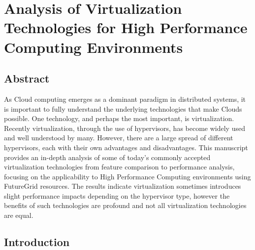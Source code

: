 


\chapter{Analysis of Virtualization Technologies for High Performance Computing Environments}
\label{chap:cloud2011}


\section{Abstract}


As Cloud computing emerges as a dominant paradigm in distributed systems, it is important to fully understand the underlying technologies that make Clouds possible.  One technology, and perhaps the most important, is virtualization. Recently virtualization, through the use of hypervisors, has become widely used and well understood by many.  However, there are a large spread of different hypervisors, each with their own advantages and disadvantages.  This manuscript provides an in-depth analysis of some of today's commonly accepted virtualization technologies from feature comparison to performance analysis, focusing on the applicability to High Performance Computing environments using FutureGrid resources.  The results indicate virtualization sometimes introduces slight performance impacts depending on the hypervisor type, however the benefits of such technologies are profound and not all virtualization technologies are equal.




\section{Introduction}



